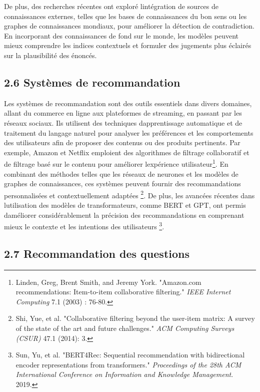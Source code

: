 \documentclass[
]{article}
\begin{document}
De plus, des recherches récentes ont exploré
l\textquotesingle intégration de sources de connaissances externes,
telles que les bases de connaissances du bon sens ou les graphes de
connaissances mondiaux, pour améliorer la détection de contradiction. En
incorporant des connaissances de fond sur le monde, les modèles peuvent
mieux comprendre les indices contextuels et formuler des jugements plus
éclairés sur la plausibilité des énoncés.

\subsection{2.6 Systèmes de
recommandation}\label{systuxe8mes-de-recommandation}

Les systèmes de recommandation sont des outils essentiels dans divers
domaines, allant du commerce en ligne aux plateformes de streaming, en
passant par les réseaux sociaux. Ils utilisent des techniques
d\textquotesingle apprentissage automatique et de traitement du langage
naturel pour analyser les préférences et les comportements des
utilisateurs afin de proposer des contenus ou des produits pertinents.
Par exemple, Amazon et Netflix emploient des algorithmes de filtrage
collaboratif et de filtrage basé sur le contenu pour améliorer
l\textquotesingle expérience utilisateur\footnote{Linden, Greg, Brent
  Smith, and Jeremy York. "Amazon.com recommendations: Item-to-item
  collaborative filtering." \emph{IEEE Internet Computing} 7.1 (2003) :
  76-80.}. En combinant des méthodes telles que les réseaux de neurones
et les modèles de graphes de connaissances, ces systèmes peuvent fournir
des recommandations personnalisées et contextuellement adaptées
\footnote{Shi, Yue, et al. "Collaborative filtering beyond the user-item
  matrix: A survey of the state of the art and future challenges."
  \emph{ACM Computing Surveys (CSUR)} 47.1 (2014): 3.}. De plus, les
avancées récentes dans l\textquotesingle utilisation des modèles de
transformateurs, comme BERT et GPT, ont permis
d\textquotesingle améliorer considérablement la précision des
recommandations en comprenant mieux le contexte et les intentions des
utilisateurs \footnote{Sun, Yu, et al. "BERT4Rec: Sequential
  recommendation with bidirectional encoder representations from
  transformers." \emph{Proceedings of the 28th ACM International
  Conference on Information and Knowledge Management}. 2019.}.

\subsection{2.7 Recommandation des
questions}\label{recommandation-des-questions}
\end{document}
